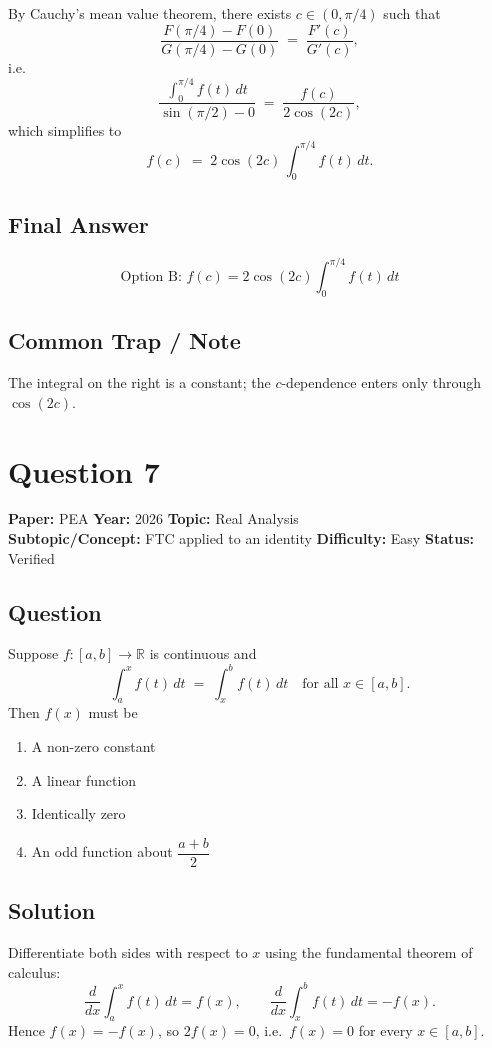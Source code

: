 \documentclass[11pt]{article}
\begin{document}
By Cauchy's mean value theorem, there exists $c \in (0,\pi/4)$ such that
\[
\frac{F(\pi/4) - F(0)}{G(\pi/4) - G(0)} \;=\; \frac{F'(c)}{G'(c)},
\]
i.e.
\[
\frac{\int_0^{\pi/4} f(t)\,dt}{\sin(\pi/2) - 0} \;=\; \frac{f(c)}{2\cos(2c)},
\]
which simplifies to
\[
f(c) \;=\; 2\cos(2c)\,\int_0^{\pi/4} f(t)\,dt.
\]

\subsection*{Final Answer}
\[
\boxed{\text{Option B: } f(c) = 2\cos(2c)\int_0^{\pi/4} f(t)\,dt}
\]

\subsection*{Common Trap / Note}
The integral on the right is a constant; the $c$-dependence enters only through $\cos(2c)$.

\section*{Question 7}
\textbf{Paper:} PEA \quad \textbf{Year:} 2026 \quad \textbf{Topic:} Real Analysis \\
\textbf{Subtopic/Concept:} FTC applied to an identity \quad
\textbf{Difficulty:} Easy \quad \textbf{Status:} Verified

\subsection*{Question}
Suppose $f:[a,b]\to\mathbb{R}$ is continuous and
\[
\int_a^x f(t)\,dt \;=\; \int_x^b f(t)\,dt \quad \text{for all } x \in [a,b].
\]
Then $f(x)$ must be
\begin{enumerate}[label=(\Alph*)]
\item A non-zero constant
\item A linear function
\item Identically zero
\item An odd function about $\dfrac{a+b}{2}$
\end{enumerate}

\subsection*{Solution}
Differentiate both sides with respect to $x$ using the fundamental theorem of calculus:
\[
\frac{d}{dx}\int_a^x f(t)\,dt = f(x), \qquad
\frac{d}{dx}\int_x^b f(t)\,dt = -f(x).
\]
Hence $f(x) = -f(x)$, so $2f(x) = 0$, i.e.\ $f(x) = 0$ for every $x \in [a,b]$.
\end{document}
